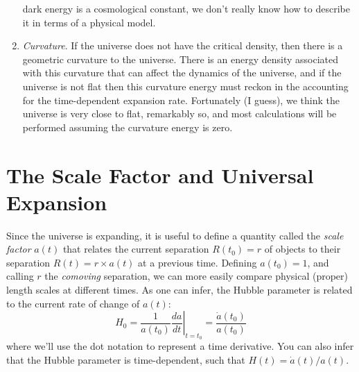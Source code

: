 \documentclass[]{article}
\begin{document}
\begin{enumerate}
dark energy is a cosmological constant, we don't really know how to describe it in terms
of a physical model.
\item {\it Curvature}. If the universe does not have the critical density, then there
is a geometric curvature to the universe. There is an energy density associated with this
curvature that can affect the dynamics of the universe, and if the universe is not flat then
this curvature energy must reckon in the accounting for the time-dependent expansion rate.  
Fortunately (I guess), we think the universe is very close to
flat, remarkably so, and most calculations will be performed assuming the curvature energy
is zero.
\end{enumerate}

\section{The Scale Factor and Universal Expansion}

Since the universe is expanding, it is useful to define a quantity called the
{\it scale factor} $a(t)$ that relates the current separation $R(t_0) = r$ of objects to
their separation $R(t) = r\times a(t)$ at a previous time.  Defining $a(t_0)=1$, and calling
$r$ the {\it comoving} separation, we can more easily compare physical (proper)
length scales at different times. As one can infer, the Hubble parameter is related
to the current rate of change of $a(t)$:
\begin{equation}
H_0 = \frac{1}{a(t_0)}\left.\frac{da}{dt}\right|_{t=t_0} = \frac{\dot{a}(t_0)}{a(t_0)}
\end{equation}
\noindent
where we'll use the dot notation to represent a time derivative.
You can also infer that the Hubble parameter is time-dependent, such that
$H(t) = \dot{a}(t)/a(t)$.
\end{document}
